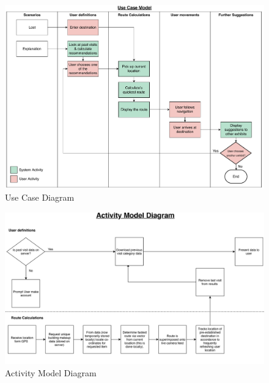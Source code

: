 
\begin{figure}[H]
    \centering
    \includegraphics[width=\textwidth]
    {assets/use_case.pdf}
    \caption{Use Case Diagram}
    \label{fig:Use Case Diagram}
\end{figure}

\begin{figure}[H]
    \centering
    \includegraphics[angle=90, width=\textwidth]
    {assets/Activity_Diagram.pdf}
    \caption{Activity Model Diagram}
    \label{fig:Activity Model Diagram}
\end{figure}
